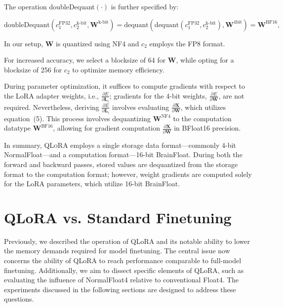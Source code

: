 The operation doubleDequant$(\cdot)$ is further specified by:

\begin{equation}
    \text{doubleDequant}(c_1^{\text{FP32}}, c_2^{\text{k-bit}}, \mathbf{W}^{\text{k-bit}}) = \text{dequant}(\text{dequant}(c_1^{\text{FP32}}, c_2^{\text{k-bit}}), \mathbf{W}^{\text{4bit}}) = \mathbf{W}^{\text{BF16}},
\end{equation}

In our setup, $\mathbf{W}$ is quantized using NF4 and $c_2$ employs the FP8 format.

For increased accuracy, we select a blocksize of 64 for $\mathbf{W}$, while opting for a blocksize of 256 for $c_2$ to optimize memory efficiency.

During parameter optimization, it suffices to compute gradients with respect to the LoRA adapter weights, i.e., $\frac{\partial E}{\partial \mathbf{L}_i}$; gradients for the 4-bit weights, $\frac{\partial E}{\partial \mathbf{W}}$, are not required. Nevertheless, deriving $\frac{\partial E}{\partial \mathbf{L}_i}$ involves evaluating $\frac{\partial \mathbf{X}}{\partial \mathbf{W}}$, which utilizes equation~(5). This process involves dequantizing $\mathbf{W}^{\text{NF4}}$ to the computation datatype $\mathbf{W}^{\text{BF16}}$, allowing for gradient computation $\frac{\partial \mathbf{X}}{\partial \mathbf{W}}$ in BFloat16 precision.

In summary, \textsc{QLoRA} employs a single storage data format—commonly 4-bit NormalFloat—and a computation format—16-bit BrainFloat. During both the forward and backward passes, stored values are dequantized from the storage format to the computation format; however, weight gradients are computed solely for the LoRA parameters, which utilize 16-bit BrainFloat.

\section{QLoRA vs. Standard Finetuning}
\label{sec:comp_to_std}

Previously, we described the operation of QLoRA and its notable ability to lower the memory demands required for model finetuning. The central issue now concerns the ability of QLoRA to reach performance comparable to full-model finetuning. Additionally, we aim to dissect specific elements of QLoRA, such as evaluating the influence of NormalFloat4 relative to conventional Float4. The experiments discussed in the following sections are designed to address these questions.

